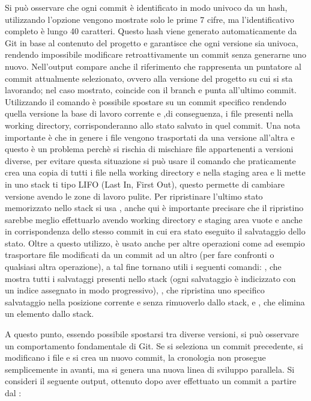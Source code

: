 Si può osservare che ogni commit è identificato in modo univoco da un hash, utilizzando l'opzione  vengono mostrate solo le prime 7 cifre, ma l'identificativo completo è lungo 40 caratteri. Questo hash viene generato automaticamente da Git in base al contenuto del progetto e garantisce che ogni versione sia univoca, rendendo impossibile modificare retroattivamente un commit senza generarne uno nuovo.
Nell'output compare anche il riferimento  che rappresenta un puntatore al commit attualmente selezionato, ovvero alla versione del progetto su cui si sta lavorando; nel caso mostrato,  coincide con il branch  e punta all'ultimo commit. Utilizzando il comando  è possibile spostare  su un commit specifico rendendo quella versione la base di lavoro corrente e ,di conseguenza, i file presenti nella working directory, corrisponderanno allo stato salvato in quel commit. Una nota importante è che in genere i file  vengono trasportati da una versione all'altra e questo è un problema perchè si rischia di mischiare file appartenenti a versioni diverse, per evitare questa situazione si può usare il comando  che praticamente crea una copia di tutti i file nella working directory e nella staging area e li mette in uno stack ti tipo LIFO (Last In, First Out), questo permette di cambiare versione avendo le zone di lavoro pulite. Per ripristinare l'ultimo stato memorizzato nello stack si usa , anche qui è importante precisare che il ripristino sarebbe meglio effettuarlo avendo working directory e staging area vuote e anche in corrispondenza dello stesso commit in cui era stato eseguito il salvataggio dello stato. Oltre a questo utilizzo,  è usato anche per altre operazioni come ad esempio trasportare file modificati da un commit ad un altro (per fare confronti o qualsiasi altra operazione), a tal fine tornano utili i seguenti comandi: , che mostra tutti i salvataggi presenti nello stack (ogni salvataggio è indicizzato con un indice assegnato in modo progressivo), , che ripristina uno specifico salvataggio nella posizione corrente e senza rimuoverlo dallo stack, e , che elimina un elemento dallo stack. 

A questo punto, essendo possibile spostarsi tra diverse versioni, si può osservare un comportamento fondamentale di Git. Se si seleziona un commit precedente, si modificano i file e si crea un nuovo commit, la cronologia non prosegue semplicemente in avanti, ma si genera una nuova linea di sviluppo parallela. Si consideri il seguente output, ottenuto dopo aver effettuato un commit a partire dal :

